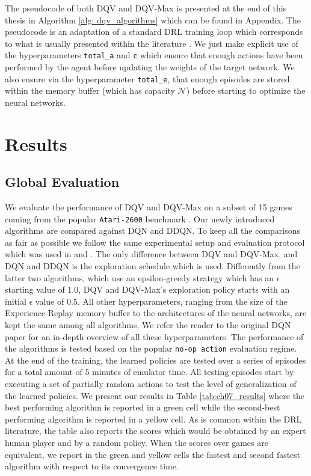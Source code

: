 The pseudocode of both DQV and DQV-Max is presented at the end of this thesis in Algorithm \ref{alg: dqv_algorithms} which can be found in Appendix. The pseudocode is an adaptation of a standard DRL training loop which corresponds to what is usually presented within the literature \cite{mnih2015human}. We just make explicit use of the hyperparameters \texttt{total\_a} and \texttt{c} which ensure that enough actions have been performed by the agent before updating the weights of the target network. We also ensure via the hyperparameter \texttt{total\_e}, that enough episodes are stored within the memory buffer (which has capacity $\mathcal{N}$) before starting to optimize the neural networks. 

\section{Results}
\label{sec:ijcnn_results}

\subsection{Global Evaluation}
\label{sec:global_evaluation}

We evaluate the performance of DQV and DQV-Max on a subset of 15 games coming from the popular \texttt{Atari-2600} benchmark \cite{bellemare2013arcade}. Our newly introduced algorithms are compared against DQN and DDQN. To keep all the comparisons as fair as possible we follow the same experimental setup and evaluation protocol which was used in \cite{mnih2015human} and \cite{van2016deep}. The only difference between DQV and DQV-Max, and DQN and DDQN is the exploration schedule which is used. Differently from the latter two algorithms, which use an epsilon-greedy strategy which has an $\epsilon$ starting value of 1.0, DQV and DQV-Max's exploration policy starts with an initial $\epsilon$ value of 0.5. All other hyperparameters, ranging from the size of the Experience-Replay memory buffer to the architectures of the neural networks, are kept the same among all algorithms. We refer the reader to the original DQN paper \cite{mnih2015human} for an in-depth overview of all these hyperparameters. The performance of the algorithms is tested based on the popular \texttt{no-op action} evaluation regime. At the end of the training, the learned policies are tested over a series of episodes for a total amount of 5 minutes of emulator time. All testing episodes start by executing a set of partially random actions to test the level of generalization of the learned policies. We present our results in Table \ref{tab:ch07_results} where the best performing algorithm is reported in a green cell while the second-best performing algorithm is reported in a yellow cell. As is common within the DRL literature, the table also reports the scores which would be obtained by an expert human player and by a random policy. When the scores over games are equivalent, we report in the green and yellow cells the fastest and second fastest algorithm with respect to its convergence time. 

